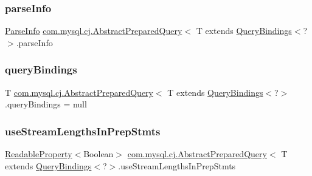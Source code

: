 \subsubsection{\texorpdfstring{parse\+Info}{parseInfo}}
{\footnotesize\ttfamily \mbox{\hyperlink{classcom_1_1mysql_1_1cj_1_1_parse_info}{Parse\+Info}} \mbox{\hyperlink{classcom_1_1mysql_1_1cj_1_1_abstract_prepared_query}{com.\+mysql.\+cj.\+Abstract\+Prepared\+Query}}$<$ T extends \mbox{\hyperlink{interfacecom_1_1mysql_1_1cj_1_1_query_bindings}{Query\+Bindings}}$<$?$>$.parse\+Info\hspace{0.3cm}{\ttfamily [protected]}}

\mbox{\label{classcom_1_1mysql_1_1cj_1_1_abstract_prepared_query_a0d53ba1433f909085f14d0b1606faeca}} 
\subsubsection{\texorpdfstring{query\+Bindings}{queryBindings}}
{\footnotesize\ttfamily T \mbox{\hyperlink{classcom_1_1mysql_1_1cj_1_1_abstract_prepared_query}{com.\+mysql.\+cj.\+Abstract\+Prepared\+Query}}$<$ T extends \mbox{\hyperlink{interfacecom_1_1mysql_1_1cj_1_1_query_bindings}{Query\+Bindings}}$<$?$>$.query\+Bindings = null\hspace{0.3cm}{\ttfamily [protected]}}

\mbox{\label{classcom_1_1mysql_1_1cj_1_1_abstract_prepared_query_adc502931c1f36d8f058dc6af52981a0b}} 
\subsubsection{\texorpdfstring{use\+Stream\+Lengths\+In\+Prep\+Stmts}{useStreamLengthsInPrepStmts}}
{\footnotesize\ttfamily \mbox{\hyperlink{interfacecom_1_1mysql_1_1cj_1_1conf_1_1_readable_property}{Readable\+Property}}$<$Boolean$>$ \mbox{\hyperlink{classcom_1_1mysql_1_1cj_1_1_abstract_prepared_query}{com.\+mysql.\+cj.\+Abstract\+Prepared\+Query}}$<$ T extends \mbox{\hyperlink{interfacecom_1_1mysql_1_1cj_1_1_query_bindings}{Query\+Bindings}}$<$?$>$.use\+Stream\+Lengths\+In\+Prep\+Stmts\hspace{0.3cm}{\ttfamily [protected]}}



